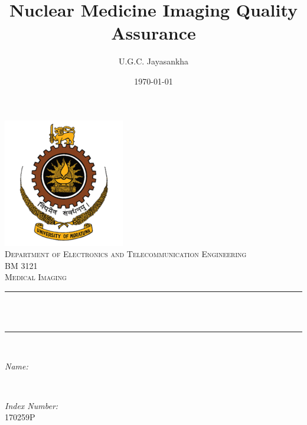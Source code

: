 \documentclass[12pt]{article}
\title{Nuclear Medicine Imaging Quality Assurance}					%
\author{U.G.C. Jayasankha}								%
\date{\today}											%
\makeatletter
\let\thetitle\@title
\let\theauthor\@author
\let\thedate\@date
\makeatother
\begin{document}

\begin{titlepage}
	\centering
    \vspace*{0.5 cm}
    \includegraphics[scale = 0.8]{University_of_Moratuwa_logo.png}\\[1.0 cm]	%
    \textsc{\Large Department of Electronics and Telecommunication Engineering}\\[0.8 cm]
	\textsc{\large BM 3121}\\[0.5 cm]				%
	\textsc{\Large Medical Imaging}\\[0.5 cm]				%
	\rule{\linewidth}{0.2 mm} \\[0.4 cm]
	{ \huge \bfseries \thetitle}\\
	\rule{\linewidth}{0.2 mm} \\[1.5 cm]
	
	\begin{minipage}{0.4\textwidth}
		\begin{flushleft} \large
			\emph{Name:}\\
			\theauthor
			\end{flushleft}
			\end{minipage}~
			\begin{minipage}{0.4\textwidth}
			\begin{flushright} \large
			\emph{Index Number:} \\
			170259P									%
		\end{flushright}
	\end{minipage}\\[2 cm]
	
	{\large \thedate}\\[2 cm]
 
	\vfill
	
\end{titlepage}
\end{document}
